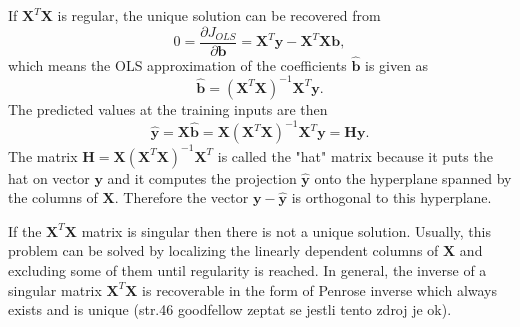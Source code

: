 \documentclass[11pt,oneside,czech,american]{book} %
\theoremstyle{plain}
\newtheorem{thm}{Theorem}
\theoremstyle{definition}
\begin{document}
If $\bm{X}^{T}\bm{X}$ is regular, the unique solution can be recovered from 
\begin{equation}
0 = \frac{\partial J_{OLS}} {\partial \bm{b}}  =   \bm{X}^T\bm{y} - \bm{X}^T\bm{X}\bm{b},
\end{equation}
 which means the OLS approximation of the coefficients $\bm{\hat{b}}$ is given as
\begin{equation}
	\bm{\hat{b}}=(\bm{X}^{T}\bm{X})^{-1}\bm{X}^{T}\bm{y}.
\end{equation}
The predicted values at the training inputs are then
\begin{equation}
	\bm{\hat{y}} = \bm{X}\bm{\hat{b}} = \bm{X}(\bm{X}^T \bm{X})^{-1}\bm{X}^T \bm{y} = \bm{H} \bm{y}.
\end{equation}
The matrix $\bm{H} =\bm{X}(\bm{X}^T \bm{X})^{-1}\bm{X}^T$ is called the "hat" matrix because it puts the hat on vector $\bm{y}$ and it computes the projection $\bm{{\hat{y}}}$ onto the hyperplane spanned by the columns of $\bm{X}$. Therefore the vector $\bm{y} - \bm{\hat{y}}$ is orthogonal to this hyperplane.

If the $\bm{X}^{T}\bm{X}$ matrix is singular then there is not a unique solution. Usually, this problem can be solved by localizing the linearly dependent columns of $\bm{X}$ and excluding some of them until regularity is reached. In general, the inverse of a singular matrix $\bm{X}^T \bm{X}$ is recoverable in the form of Penrose inverse which always exists and is unique \parencite{goodfellow16} (str.46 goodfellow zeptat se jestli tento zdroj je ok).


\end{document}
